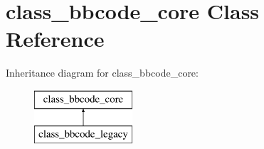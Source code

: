 \hypertarget{classclass__bbcode__core}{\section{class\-\_\-bbcode\-\_\-core Class Reference}
\label{classclass__bbcode__core}
}
Inheritance diagram for class\-\_\-bbcode\-\_\-core\-:\begin{figure}[H]
\begin{center}
\leavevmode
\includegraphics[height=2.000000cm]{classclass__bbcode__core}
\end{center}
\end{figure}
